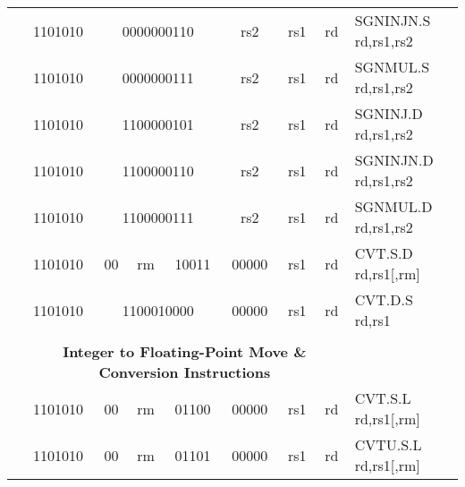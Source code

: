 \begin{table}[p]
\begin{small}
\begin{center}
\begin{tabular}{rcccccccccl}
&
\multicolumn{1}{|c|}{1101010} &
\multicolumn{5}{c|}{0000000110} &
\multicolumn{1}{c|}{rs2} &
\multicolumn{1}{c|}{rs1} &
\multicolumn{1}{c|}{rd} & SGNINJN.S rd,rs1,rs2 \\
\cline{2-10}
  

&
\multicolumn{1}{|c|}{1101010} &
\multicolumn{5}{c|}{0000000111} &
\multicolumn{1}{c|}{rs2} &
\multicolumn{1}{c|}{rs1} &
\multicolumn{1}{c|}{rd} & SGNMUL.S rd,rs1,rs2 \\
\cline{2-10}
  

&
\multicolumn{1}{|c|}{1101010} &
\multicolumn{5}{c|}{1100000101} &
\multicolumn{1}{c|}{rs2} &
\multicolumn{1}{c|}{rs1} &
\multicolumn{1}{c|}{rd} & SGNINJ.D rd,rs1,rs2 \\
\cline{2-10}
  

&
\multicolumn{1}{|c|}{1101010} &
\multicolumn{5}{c|}{1100000110} &
\multicolumn{1}{c|}{rs2} &
\multicolumn{1}{c|}{rs1} &
\multicolumn{1}{c|}{rd} & SGNINJN.D rd,rs1,rs2 \\
\cline{2-10}
  

&
\multicolumn{1}{|c|}{1101010} &
\multicolumn{5}{c|}{1100000111} &
\multicolumn{1}{c|}{rs2} &
\multicolumn{1}{c|}{rs1} &
\multicolumn{1}{c|}{rd} & SGNMUL.D rd,rs1,rs2 \\
\cline{2-10}
  

&
\multicolumn{1}{|c|}{1101010} &
\multicolumn{1}{c|}{00} &
\multicolumn{2}{c|}{rm} &
\multicolumn{2}{c|}{10011} &
\multicolumn{1}{c|}{00000} &
\multicolumn{1}{c|}{rs1} &
\multicolumn{1}{c|}{rd} & CVT.S.D rd,rs1[,rm] \\
\cline{2-10}
  

&
\multicolumn{1}{|c|}{1101010} &
\multicolumn{5}{c|}{1100010000} &
\multicolumn{1}{c|}{00000} &
\multicolumn{1}{c|}{rs1} &
\multicolumn{1}{c|}{rd} & CVT.D.S rd,rs1 \\
\cline{2-10}
  

&
\multicolumn{9}{c}{} & \\
&
\multicolumn{9}{c}{\bf Integer to Floating-Point Move \& Conversion Instructions} & \\
\cline{2-10}
  

&
\multicolumn{1}{|c|}{1101010} &
\multicolumn{1}{c|}{00} &
\multicolumn{2}{c|}{rm} &
\multicolumn{2}{c|}{01100} &
\multicolumn{1}{c|}{00000} &
\multicolumn{1}{c|}{rs1} &
\multicolumn{1}{c|}{rd} & CVT.S.L rd,rs1[,rm] \\
\cline{2-10}
  

&
\multicolumn{1}{|c|}{1101010} &
\multicolumn{1}{c|}{00} &
\multicolumn{2}{c|}{rm} &
\multicolumn{2}{c|}{01101} &
\multicolumn{1}{c|}{00000} &
\multicolumn{1}{c|}{rs1} &
\multicolumn{1}{c|}{rd} & CVTU.S.L rd,rs1[,rm] \\
\cline{2-10}
  


\end{tabular}
\end{center}
\end{small}
\end{table}
